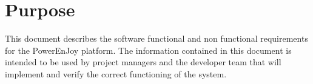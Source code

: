 \section{Purpose}
This document describes the software functional and non functional requirements for the PowerEnJoy platform. The information contained in this document is intended to be used by project managers and the developer team that will implement and verify the correct functioning of the system.